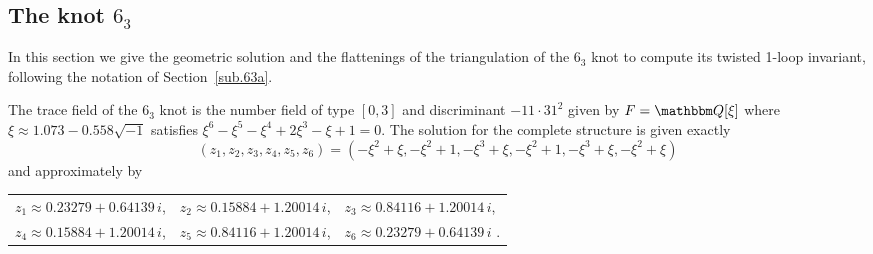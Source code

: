 \documentclass[12pt,reqno]{amsart}
\theoremstyle{definition}
\def\BQ{\mathbbm Q}
\def\be{\begin{equation}}
\def\ee{\end{equation}}
\begin{document}
\subsection{The  knot $6_3$}
\label{sub.63}

In this section we give the geometric solution and the flattenings of the triangulation
of the $6_3$ knot to compute its twisted 1-loop invariant, following the notation
of Section~\ref{sub.63a}.

The trace field of the $6_3$ knot is the number field of type $[0,3]$ and discriminant
$-11 \cdot 31^2$ given by $F=\BQ[\xi]$ where $\xi \approx 1.073 - 0.558 \sqrt{-1}$
satisfies
$\xi^6 - \xi^5 - \xi^4 + 2 \xi^3 - \xi + 1=0$.  
The solution for the complete structure is given exactly
\be
(z_1, z_2, z_3, z_4, z_5, z_6)
=(-\xi^2 + \xi, -\xi^2 + 1, -\xi^3 + \xi,-\xi^2 + 1, -\xi^3 + \xi,-\xi^2 + \xi)
\ee
and approximately by
\begin{center}
\begin{tabular}{lll}
  $z_1 \approx 0.23279 + 0.64139 \, i$,
  & $ z_2\approx 0.15884 + 1.20014 \, i $,
  & $z_3 \approx 0.84116 + 1.20014 \, i$, \\
  $z_4 \approx  0.15884 + 1.20014 \, i $,
  & $z_5  \approx 0.84116+ 1.20014 \, i$,
  &  $z_6 \approx 0.23279 + 0.64139 \, i$  .
\end{tabular}
\end{center}
\end{document}
